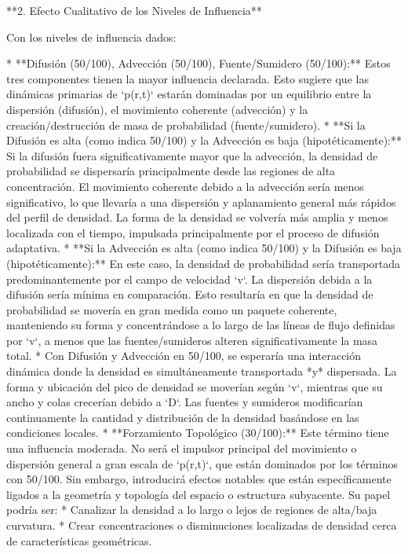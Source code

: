 \documentclass{book}
\begin{document}
**2. Efecto Cualitativo de los Niveles de Influencia**

Con los niveles de influencia dados:

*   **Difusión (50/100), Advección (50/100), Fuente/Sumidero (50/100):** Estos tres componentes tienen la mayor influencia declarada. Esto sugiere que las dinámicas primarias de `p(r,t)` estarán dominadas por un equilibrio entre la dispersión (difusión), el movimiento coherente (advección) y la creación/destrucción de masa de probabilidad (fuente/sumidero).
    *   **Si la Difusión es alta (como indica 50/100) y la Advección es baja (hipotéticamente):** Si la difusión fuera significativamente mayor que la advección, la densidad de probabilidad se dispersaría principalmente desde las regiones de alta concentración. El movimiento coherente debido a la advección sería menos significativo, lo que llevaría a una dispersión y aplanamiento general más rápidos del perfil de densidad. La forma de la densidad se volvería más amplia y menos localizada con el tiempo, impulsada principalmente por el proceso de difusión adaptativa.
    *   **Si la Advección es alta (como indica 50/100) y la Difusión es baja (hipotéticamente):** En este caso, la densidad de probabilidad sería transportada predominantemente por el campo de velocidad `v`. La dispersión debida a la difusión sería mínima en comparación. Esto resultaría en que la densidad de probabilidad se movería en gran medida como un paquete coherente, manteniendo su forma y concentrándose a lo largo de las líneas de flujo definidas por `v`, a menos que las fuentes/sumideros alteren significativamente la masa total.
    *   Con Difusión y Advección en 50/100, se esperaría una interacción dinámica donde la densidad es simultáneamente transportada *y* dispersada. La forma y ubicación del pico de densidad se moverían según `v`, mientras que su ancho y colas crecerían debido a `D`. Las fuentes y sumideros modificarían continuamente la cantidad y distribución de la densidad basándose en las condiciones locales.
*   **Forzamiento Topológico (30/100):** Este término tiene una influencia moderada. No será el impulsor principal del movimiento o dispersión general a gran escala de `p(r,t)`, que están dominados por los términos con 50/100. Sin embargo, introducirá efectos notables que están específicamente ligados a la geometría y topología del espacio o estructura subyacente. Su papel podría ser:
    *   Canalizar la densidad a lo largo o lejos de regiones de alta/baja curvatura.
    *   Crear concentraciones o disminuciones localizadas de densidad cerca de características geométricas.
\end{document}
